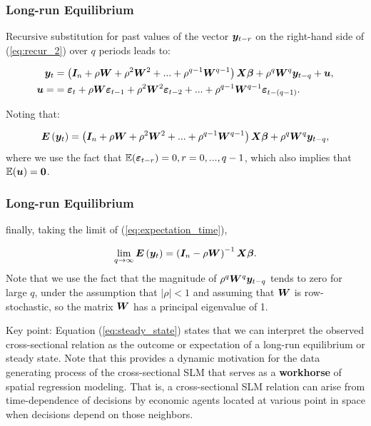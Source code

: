 \documentclass[english,10pt]{beamer}\usepackage[]{graphicx}\usepackage[]{xcolor}
\begin{document}
\begin{frame}
  \frametitle{Long-run Equilibrium}
    Recursive substitution for past values of the vector $\bm y_{t-r}$ on the right-hand side of (\ref{eq:recur_2}) over $q$ periods leads to:

\begin{equation*}
  \begin{aligned}
    \bm y_t &= \left(\bm I_n + \rho\bm W + \rho^2\bm W^2 + ... + \rho^{q-1}\bm W^{q-1}\right)\bm X\bm \beta + \rho^q\bm W^q\bm y_{t-q} + \bm u,\\
    \bm u = & = \bm {\varepsilon}_{t} + \rho\bm W\bm {\varepsilon}_{t-1} + \rho^2\bm W^2\bm {\varepsilon}_{t-2} + ... + \rho^{q-1}\bm W^{q-1}\bm {\varepsilon}_{t - (q-1)}. 
  \end{aligned}
\end{equation*}

Noting that:

\begin{equation}\label{eq:expectation_time}
  \bm E\left(\bm y_t\right) = \left(\bm I_n + \rho\bm W + \rho^2\bm W^2 + ... + \rho^{q-1}\bm W^{q-1}\right)\bm X\bm \beta + \rho^q\bm W^q\bm y_{t-q},
\end{equation}
%
where we use the fact that $\mathbb{E}(\bm {\varepsilon}_{t-r}) = 0, r = 0, ..., q-1$, which also implies that $\mathbb{E}(\bm u) = \boldsymbol{0}$.
\end{frame}


\begin{frame}
  \frametitle{Long-run Equilibrium}
  finally, taking the limit of (\ref{eq:expectation_time}), 


\begin{equation}\label{eq:steady_state}
\lim_{q\to \infty} \bm E\left(\bm y_t\right) = \left(\bm I_n - \rho\bm W\right)^{-1}\bm X\bm \beta.
\end{equation}
%
Note that we use the fact that the magnitude of $\rho^q\bm W^q\bm y_{t-q}$ tends to zero for large $q$, under the assumption that $\lvert \rho \rvert <1$ and assuming that $\bm W$ is row-stochastic, so the matrix $\bm W$ has a principal eigenvalue of 1. 

\begin{alertblock}{Key point:}
Equation (\ref{eq:steady_state}) states that we can interpret the observed cross-sectional relation as the outcome or expectation of a long-run equilibrium or steady state. Note that this provides a dynamic motivation for the data generating process of the cross-sectional SLM that serves as a \textbf{workhorse} of spatial regression modeling. That is, a cross-sectional SLM relation can arise from time-dependence of decisions by economic agents located at various point in space when decisions depend on those neighbors. 
\end{alertblock}
\end{frame}
\end{document}
